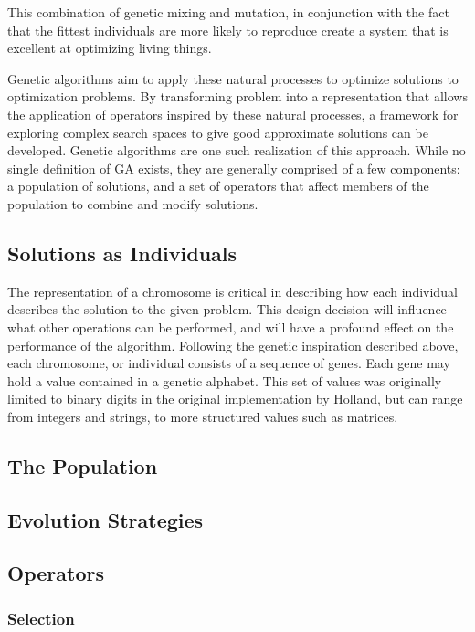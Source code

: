 This combination of genetic mixing and mutation, in conjunction with the fact that the fittest individuals are more likely to reproduce create a system that is excellent at optimizing living things. 
  
Genetic algorithms aim to apply these natural processes to optimize solutions to optimization problems. By transforming problem into a representation that allows the application of operators inspired by these natural processes, a framework for exploring complex search spaces to give good approximate solutions can be developed. Genetic algorithms are one such realization of this approach. While no single definition of GA exists, they are generally comprised of a few components: a population of solutions, and a set of operators that affect members of the population to combine and modify solutions.

\subsection{Solutions as Individuals}

The representation of a chromosome is critical in describing how each individual describes the solution to the given problem. This design decision will influence what other operations can be performed, and will have a profound effect on the performance of the algorithm. Following the genetic inspiration described above, each chromosome, or individual consists of a sequence of genes. Each gene may hold a value contained in a genetic alphabet. This set of values was originally limited to binary digits in the original implementation by Holland, but can range from integers and strings, to more structured values such as matrices.

\subsection{The Population}

\subsection{Evolution Strategies}

\subsection{Operators}


\subsubsection{Selection}


